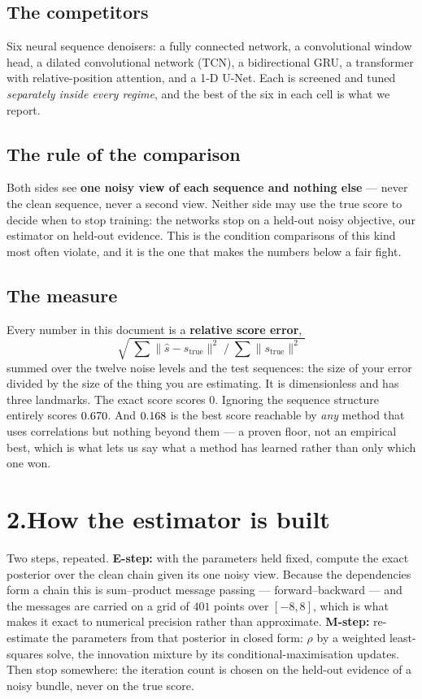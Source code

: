 \documentclass[10pt,a4paper]{article}
\newcommand{\corr}{\rho}
\begin{document}
\subsection{The competitors} Six neural sequence denoisers: a fully connected network, a
convolutional window head, a dilated convolutional network (TCN), a bidirectional GRU, a
transformer with relative-position attention, and a 1-D U-Net. Each is screened and tuned
\emph{separately inside every regime}, and the best of the six in each cell is what we report.

\subsection{The rule of the comparison} Both sides see \textbf{one noisy view of each sequence and
nothing else} --- never the clean sequence, never a second view. Neither side may use the true
score to decide when to stop training: the networks stop on a held-out noisy objective, our
estimator on held-out evidence. This is the condition comparisons of this kind most often violate,
and it is the one that makes the numbers below a fair fight.

\subsection{The measure} Every number in this document is a \textbf{relative score error},
\[
\sqrt{\;\textstyle\sum \lVert \hat s - s_{\text{true}}\rVert^2 \;\Big/\; \sum \lVert s_{\text{true}}\rVert^2\;}
\]
summed over the twelve noise levels and the test sequences: the size of your error divided by the
size of the thing you are estimating. It is dimensionless and has three landmarks. The exact score
scores $0$. Ignoring the sequence structure entirely scores $0.670$. And
$0.168$ is the best score reachable by \emph{any} method that uses correlations but
nothing beyond them --- a proven floor, not an empirical best, which is what lets us say what a
method has learned rather than only which one won.

\section*{2.\quad How the estimator is built}

Two steps, repeated. \textbf{E-step:} with the parameters held fixed, compute the exact posterior
over the clean chain given its one noisy view. Because the dependencies form a chain this is
sum--product message passing --- forward--backward --- and the messages are carried on a grid of
$401$ points over $[-8,8]$, which is what makes it exact to numerical precision rather than
approximate. \textbf{M-step:} re-estimate the parameters from that posterior in closed form:
$\corr$ by a weighted least-squares solve, the innovation mixture by its conditional-maximisation
updates. Then stop somewhere: the iteration count is chosen on the held-out evidence of a noisy
bundle, never on the true score.
\end{document}
